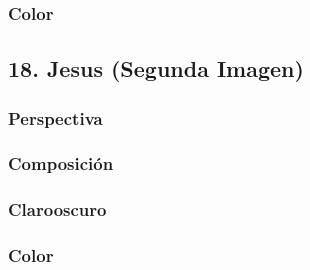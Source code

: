 \documentclass[12pt]{article}
\begin{document}
        \subsubsection{Color}
    \subsection{18. Jesus (Segunda Imagen)}
        \subsubsection{Perspectiva}

        \subsubsection{Composición}

        \subsubsection{Clarooscuro}

        \subsubsection{Color}
        
\end{document}
